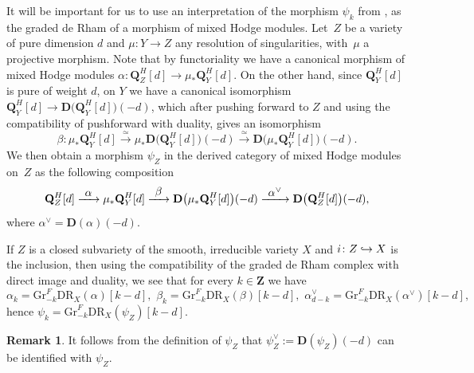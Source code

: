 \documentclass[JEP,XML,SOM,Unicode]{cedram}
\newcommand{\To}[1]{\mathchoice{\xrightarrow{\textstyle\kern4pt#1\kern3pt}}{\stackrel{#1}{\longrightarrow}}{}{}}
\newcommand\hto{\mathrel{\lhook\joinrel\to}}
\let\ts\textstyle
\theoremstyle{plain}
\theoremstyle{definition}
\newtheorem{rmk}[thm]{Remark}
\newcommand\Z{{\mathbf Z}}
\newcommand\Q{{\mathbf Q}}
\newcommand\gr{\mathrm{Gr}}
\newcommand\DR{\mathrm{DR}}
\begin{document}
It will be important for us to use an interpretation of the morphism $\psi_k$ from \cite[App.]{FL2}, as the graded de Rham of a
morphism of mixed Hodge modules. Let~$Z$ be a variety of pure dimension $d$ and $\mu\colon Y\to Z$ any resolution of singularities,
with~$\mu$ a projective morphism.
Note that by functoriality we have a canonical morphism of mixed Hodge modules $\alpha\colon \Q_Z^H[d]\to\mu_*\Q^H_Y[d]$. On the other hand,
since $\Q_Y^H[d]$ is pure of weight $d$,
on $Y$ we have a canonical
isomorphism $\Q_Y^H[d]\to {\mathbf D}\big(\Q_Y^H[d]\big)(-d)$, which after pushing forward to $Z$ and using the compatibility of pushforward with duality,
gives an isomorphism
\[\beta\colon \mu_*\Q_Y^H[d]\overset{\simeq}\longrightarrow \mu_*{\mathbf D}\big(\Q_Y^H[d]\big)(-d)\overset{\simeq}\longrightarrow
{\mathbf D}\big(\mu_*\Q_Y^H[d]\big)(-d).\]
We then obtain a morphism $\psi_Z$ in the derived category of mixed Hodge modules on~$Z$ as the following composition
\begin{equation}\label{eq_psi}
\Q_Z^H[d]\To{\ts\alpha} \mu_*\Q_Y^H[d]\To{\ts\beta} {\mathbf D}\big(\mu_*\Q_Y^H[d]\big)(-d)
\To{\ts\alpha^{\vee}}{\mathbf D}\big(\Q_Z^H[d]\big)(-d),
\end{equation}
where $\alpha^{\vee}={\mathbf D}(\alpha)(-d)$.

If $Z$ is a closed subvariety of the smooth, irreducible variety $X$ and $i\colon Z\hto X$ is the inclusion, then using the compatibility of
the graded de Rham complex with direct image and duality, we see that for every $k\in\Z$ we have
\[\alpha_k=\gr^F_{-k}\DR_X(\alpha)[k-d], \,\,\beta_k=\gr^F_{-k}\DR_X(\beta)[k-d],\,\,\alpha_{d-k}^{\vee}=
\gr^F_{-k}\DR_X(\alpha^{\vee})[k-d],\]
hence $\psi_k=\gr^F_{-k}\DR_X(\psi_Z)[k-d]$.

\begin{rmk}\label{dual_psi}
It follows from the definition of $\psi_Z$ that $\psi_Z^{\vee}:={\mathbf D}(\psi_Z)(-d)$ can be identified with $\psi_Z$.
\end{rmk}
\end{document}
